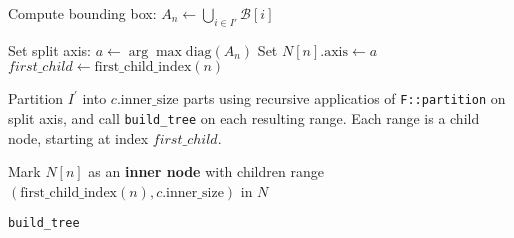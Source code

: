 \begin{algorithm}[!t]
\SetAlgoLined
{}

Compute bounding box: $A_n \gets \bigcup_{i \in I'} \mathcal{B}[i]$\;


Set split axis: $a \gets \arg\max \mathrm{diag}(A_n)$\;
Set $N[n].\mathrm{axis} \gets a$\;
\hspace{1em} $first\_child \gets \mathrm{first\_child\_index}(n)$\;

Partition $I^\prime$ into $c.\mathrm{inner\_size}$ parts using recursive applicatios of \texttt{F::partition} on split axis,
and call \texttt{build\_tree} on each resulting range. Each range
is a child node, starting at index $first\_child$.

Mark $N[n]$ as an \textbf{inner node} with children range
$(\mathrm{first\_child\_index}(n), c.\mathrm{inner\_size})$ in $N$\;

\caption{\texttt{build\_tree}}
\label{alg:build-tree}
\end{algorithm}

